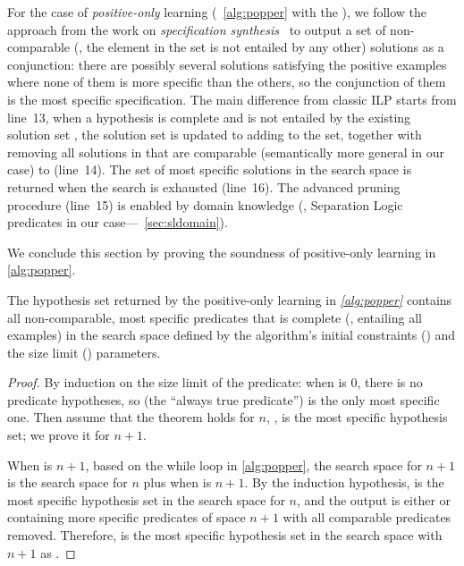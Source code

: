 For the case of \emph{positive-only} learning
(\cf~\autoref{alg:popper} with the ), we
follow the approach from the work on \emph{specification
  synthesis}~\cite{park2023synthesizing} to output a set of
non-comparable (\ie, the element in the set is not entailed by any other) solutions as a conjunction: there are possibly several
solutions satisfying the positive examples where none of them is more
specific than the others, so the conjunction of them is the most
specific specification. 
%
The main difference from classic ILP starts from line~13, when a
hypothesis  is complete and is not entailed by the existing
solution set , the solution set is updated to adding
 to the set, together with removing all solutions in
 that are comparable (semantically more general in our
case) to  (line~14).
%
The set of most specific solutions in the search space is returned
when the search is exhausted (line~16). The advanced pruning procedure
(line~15) is enabled by domain knowledge (\ie, Separation Logic
predicates in our case---\cf~\autoref{sec:sldomain}).

We conclude this section by proving the soundness of positive-only learning in \autoref{alg:popper}.

\begin{theorem}
  \label{thm:specific}
  The hypothesis set returned by the positive-only learning in
  \emph{\autoref{alg:popper}} contains all non-comparable, most specific predicates that is complete (\ie, entailing all examples) in the search
  space defined by the algorithm's initial constraints
  () and the size limit () parameters.
\end{theorem}
\begin{proof}[Proof]
  By induction on the size limit  of the predicate: when  is 0, there is no predicate hypotheses, so  (the ``always true predicate'') is the only most specific one. Then assume that the theorem holds for  $n$, \ie,  is the most specific hypothesis set; we prove it for  $n+1$.

  When  is $n+1$, based on the while loop in
  \autoref{alg:popper}, the search space for $n+1$ is the search space
  for $n$ plus when  is $n+1$. By the induction
  hypothesis,  is the most specific hypothesis set in the search space
  for $n$, and the output  is either  or containing
  more specific predicates of space $n+1$ with all comparable predicates removed. Therefore,  is the most
  specific hypothesis set in the search space with $n+1$ as .

\end{proof}





